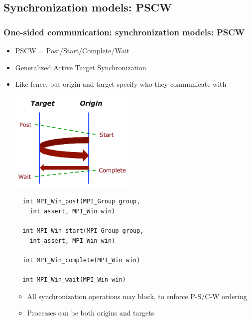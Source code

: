 \documentclass{beamer}
\begin{document}
\subsection{Synchronization models: PSCW}
\begin{frame}[fragile]
  \frametitle{One-sided communication: synchronization models: PSCW }
  \begin{itemize}
    \item PSCW = Post/Start/Complete/Wait
    \item Generalized Active Target Synchronization
    \item Like fence, but origin and target specify who they communicate with
\begin{multicols}{2}
\includegraphics[width=6.0cm]{graphs/pscw.png}
{\color{mycolorcode}
{\tiny
\begin{verbatim}
  int MPI_Win_post(MPI_Group group, 
    int assert, MPI_Win win)

  int MPI_Win_start(MPI_Group group, 
    int assert, MPI_Win win)

  int MPI_Win_complete(MPI_Win win)

  int MPI_Win_wait(MPI_Win win)
\end{verbatim}
}
}
\begin{itemize}
\item All synchronization operations may block, to enforce P-S/C-W ordering
\item Processes can be both origins and targets
\end{itemize}
\end{multicols}
  \end{itemize}
\end{frame}
\end{document}
